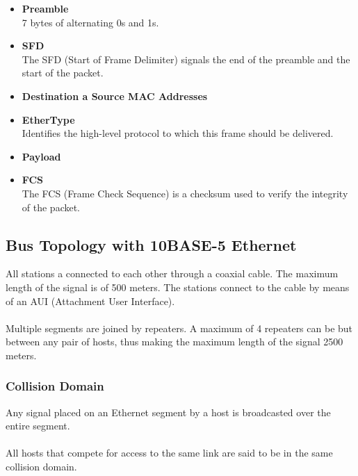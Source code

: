 \documentclass{article}
\begin{document}
\begin{itemize}
	\item \textbf{Preamble}
	\vspace{.2cm} \\	
	7 bytes of alternating 0s and 1s.
	
	\item \textbf{SFD}
	\vspace{.2cm} \\
	The SFD (Start of Frame Delimiter) signals the end of the preamble and the start of the packet.
	
	\item \textbf{Destination a Source MAC Addresses}
	
	\item \textbf{EtherType}
	\vspace{.2cm} \\
	Identifies the high-level protocol to which this frame should be delivered.
	
	\item \textbf{Payload}
	
	\item \textbf{FCS}
	\vspace{.2cm} \\
	The FCS (Frame Check Sequence) is a checksum used to verify the integrity of the packet.
\end{itemize}

\subsection{Bus Topology with 10BASE-5 Ethernet}
All stations a connected to each other through a coaxial cable. The maximum length of the signal is of 500 meters. The stations connect to the cable by means of an AUI (Attachment User Interface). \\ \\
Multiple segments are joined by repeaters. A maximum of 4 repeaters can be but between any pair of hosts, thus making the maximum length of the signal 2500 meters.

\subsubsection{Collision Domain}
Any signal placed on an Ethernet segment by a host is broadcasted over the entire segment. \\ \\
All hosts that compete for access to the same link are said to be in the same collision domain.
\end{document}
